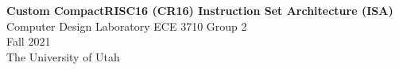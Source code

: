 \documentclass{article}
\begin{document}
\begin{center}

%
%
\LARGE{\textbf{Custom CompactRISC16 (CR16) Instruction Set Architecture (ISA)}}\\[7pt]
%
%

%
%
%
%

\normalsize{Computer Design Laboratory ECE 3710 Group 2}\\
\normalsize{Fall 2021}\\
\normalsize{The University of Utah}
\end{center}
\end{document}
